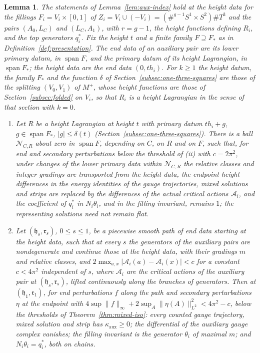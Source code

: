 \documentclass[11pt]{amsart}
\newtheorem{lemma}[theorem]{Lemma}
\theoremstyle{definition}
\theoremstyle{remark}
\theoremstyle{plain}
\numberwithin{equation}{section}
\begin{document}
\begin{lemma}\label{lem:aux-index-folded}
The statements of Lemma~\ref{lem:aux-index} hold at the height data for the fillings
$F_i=V_i\times[0,1]$ of $Z_i=V_i\cup(-V_i)=(\#^{g-1}S^1\times S^2)\#T^3$ and the
pairs $(A_0,L_C)$ and $(L_C,A_1)$, with $r=g-1$, the height functions defining $R_i$, and the
top generators $q_i^*$. Fix the height $t$ and a finite family $F\supseteq F_*$ as in
Definition~\ref{def:presentation}. The \emph{end data} of an auxiliary pair are its lower
primary datum, in $\operatorname{span}F$, and the primary datum of its height Lagrangian, in
$\operatorname{span}F_*$; the \emph{height data} are the end data $(0,th_i)$. For $k\ge1$ the
height datum, the family $F_*$ and the function $\delta$ of Section~\ref{subsec:one-three-squares}
are those of the splitting $(V_0,V_1)$ of $M^+$, whose height functions are those of
Section~\ref{subsec:folded} on $V_i$, so that $R_i$ is a height Lagrangian in the sense of that
section with $k=0$.
\begin{enumerate}[label=(\roman*)]
\item Let $R$ be a height Lagrangian at height $t$ with primary datum $th_i+g$,
  $g\in\operatorname{span}F_*$, $|g|\le\delta(t)$ (Section~\ref{subsec:one-three-squares}).
  There is a ball $\mathcal N_{C,R}$ about zero in $\operatorname{span}F$, depending
  on $C$, on $R$ and on $F$, such that, for end and secondary perturbations below the threshold
  of (ii) with $c=2\pi^2$, under changes of the lower primary data within
  $\mathcal N_{C,R}$ the relative classes and integer gradings are transported from the height
  data, the endpoint height differences in the energy identities of the gauge trajectories, mixed
  solutions and strips are replaced by the differences
  of the actual critical actions $\mathcal A_i$, and the coefficient of $q_i^*$ in $N_i\theta_i$,
  and in the filling invariant, remains $1$; the representing solutions need not remain flat.
\item Let $(\mathfrak h_s,\mathfrak r_s)$, $0\le s\le1$, be a piecewise smooth path of end data
  starting at the height data, such that at every $s$ the generators of the auxiliary pairs are
  nondegenerate and continue those at the height data, with their gradings $m$ and relative
  classes, and $2\max_{a,x}|\mathcal A_i(a)-\mathcal A_i(x)|<c$ for a constant $c<4\pi^2$
  independent of $s$, where $\mathcal A_i$ are the critical actions of the auxiliary pair at
  $(\mathfrak h_s,\mathfrak r_s)$, lifted continuously along the branches of generators. Then at
  $(\mathfrak h_1,\mathfrak r_1)$, for end perturbations $f$ along the path and secondary
  perturbations $\eta$ at the endpoint with
  $4\sup\|f\|_\infty+2\sup_A\|\eta(A)\|^2_{L^2}<4\pi^2-c$, below the thresholds of
  Theorem~\ref{thm:mixed-iso}: every counted gauge trajectory, mixed solution and strip has
  $\kappa_{\mathrm{aux}}\ge0$; the differential of the auxiliary gauge complex vanishes; the
  filling invariant is the generator $\theta_i$ of maximal $m$; and $N_i\theta_i=q_i^*$, both on
  chains.
\end{enumerate}
\end{lemma}
\end{document}
